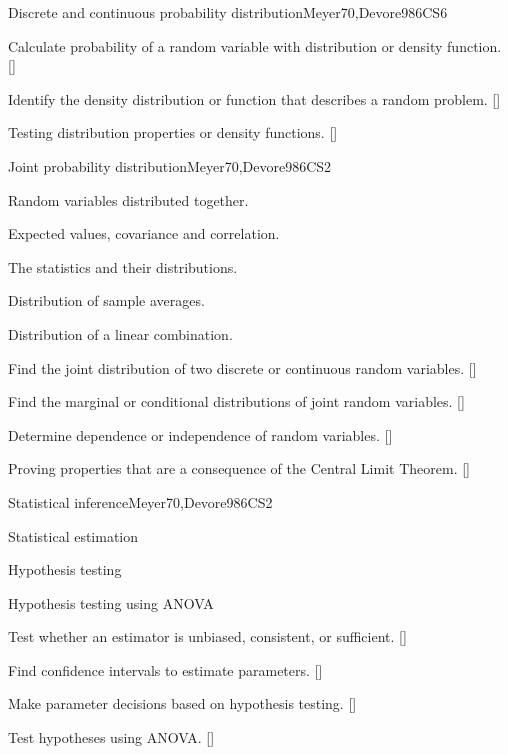 \begin{syllabus}
\begin{unit}{}{Discrete and continuous probability distribution}{Meyer70,Devore98}{6}{CS6}
   \begin{learningoutcomes}
      \item Calculate probability of a random variable with distribution or density function. [\Usage]
      \item Identify the density distribution or function that describes a random problem. [\Usage]
      \item Testing distribution properties or density functions. [\Usage]
   \end{learningoutcomes}
\end{unit}

\begin{unit}{}{Joint probability distribution}{Meyer70,Devore98}{6}{CS2}
\begin{topics}
      \item Random variables distributed together.
      \item Expected values, covariance and correlation.
      \item The statistics and their distributions.
      \item Distribution of sample averages.
      \item Distribution of a linear combination.

   \end{topics}
   \begin{learningoutcomes}
      \item Find the joint distribution of two discrete or continuous random variables. [\Usage]
      \item Find the marginal or conditional distributions of joint random variables. [\Usage]
      \item Determine dependence or independence of random variables. [\Usage]
      \item Proving properties that are a consequence of the Central Limit Theorem. [\Usage]
   \end{learningoutcomes}
\end{unit}

\begin{unit}{}{Statistical inference}{Meyer70,Devore98}{6}{CS2}
\begin{topics}
      \item Statistical estimation 
      \item Hypothesis testing
      \item Hypothesis testing using ANOVA
   \end{topics}

   \begin{learningoutcomes}
      \item Test whether an estimator is unbiased, consistent, or sufficient. [\Usage]
      \item Find confidence intervals to estimate parameters. [\Usage]
      \item Make parameter decisions based on hypothesis testing. [\Usage]
      \item Test hypotheses using ANOVA. [\Usage]
   \end{learningoutcomes}
\end{unit}


\end{syllabus}

